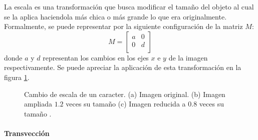 			La escala es una transformación que busca modificar el tamaño del objeto al cual se la aplica haciendola más chica o más grande lo que era originalmente. Formalmente, se puede representar por la siguiente configuración de la matriz $M$:
			\begin{equation}
				M = 
				\begin{bmatrix}
					a & 0 \\
					0 & d \\
				\end{bmatrix}
			\end{equation}
		donde $a$ y $d$ representan los cambios en los ejes $x$ e $y$ de la imagen respectivamente. Se puede apreciar la aplicación de esta transformación en la figura \ref{fig: Transformacion Afin - Escala}.
		\begin{figure}[htbp]
			\centering
			\caption[Cambio de escala de un caracter]{Cambio de escala de un caracter. (a) Imagen original. (b) Imagen ampliada $1.2$ veces su tamaño  (c) Imagen reducida a $0.8$ veces su tamaño .}
			\label{fig: Transformacion Afin - Escala}
		\end{figure}	
			
		\paragraph{Transvección}
		
